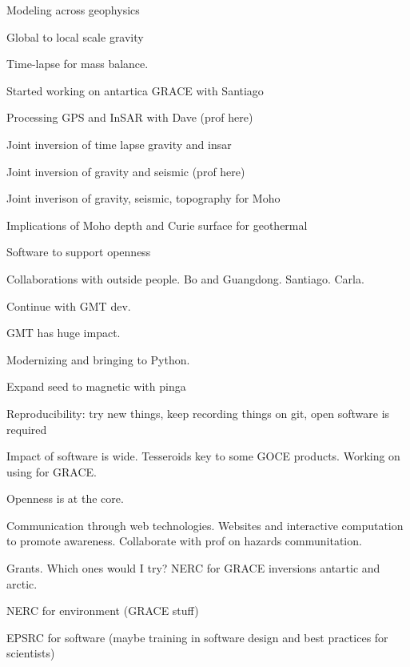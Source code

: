 \documentclass[12pt,notitlepage]{article}
\begin{document}



Modeling across geophysics

Global to local scale gravity

Time-lapse for mass balance.

Started working on antartica GRACE with Santiago

Processing GPS and InSAR with Dave (prof here)

Joint inversion of time lapse gravity and insar

Joint inversion of gravity and seismic (prof here)

Joint inverison of gravity, seismic, topography for Moho

Implications of Moho depth and Curie surface for geothermal

Software to support openness

Collaborations with outside people. Bo and Guangdong. Santiago. Carla.

Continue with GMT dev.

GMT has huge impact.

Modernizing and bringing to Python.

Expand seed to magnetic with pinga

Reproducibility: try new things, keep recording things on git, open software is required

Impact of software is wide. Tesseroids key to some GOCE products. Working on using for
GRACE.

Openness is at the core.

Communication through web technologies. Websites and interactive computation to promote
awareness. Collaborate with prof on hazards communitation.

Grants. Which ones would I try? NERC for GRACE inversions antartic and arctic.

NERC for environment (GRACE stuff)

EPSRC for software (maybe training in software design and best practices for scientists)
\end{document}
